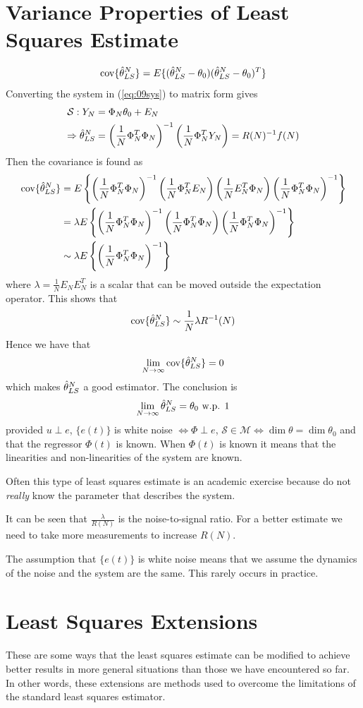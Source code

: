 \section{Variance Properties of Least Squares Estimate}
$$\text{cov}\{\hat{\theta}_{LS}^N\} = E\{(\hat{\theta}_{LS}^N-\theta_0)(\hat{\theta}_{LS}^N-\theta_0)^T\}$$
Converting the system in (\ref{eq:09sys}) to matrix form gives
\begin{align*}
\mathcal{S}: Y_N &= \Phi_N\theta_0+E_N \\
\Rightarrow \hat{\theta}_{LS}^N &= \left(\frac{1}{N}\Phi_N^T\Phi_N\right)^{-1}\left(\frac{1}{N}\Phi_N^TY_N\right) = R(N)^{-1}f(N)
\end{align*}
Then the covariance is found as
\begin{align*}
\text{cov}\{\hat{\theta}_{LS}^N\} &= E\left\lbrace\left(\frac{1}{N}\Phi_N^T\Phi_N\right)^{-1} \left(\frac{1}{N}\Phi_N^TE_N\right) \left(\frac{1}{N}E_N^T\Phi_N\right) \left(\frac{1}{N}\Phi_N^T\Phi_N\right)^{-1}\right\rbrace \\
&= \lambda E\left\lbrace\left(\frac{1}{N}\Phi_N^T\Phi_N\right)^{-1} \left(\frac{1}{N}\Phi_N^T\Phi_N\right) \left(\frac{1}{N}\Phi_N^T\Phi_N\right)^{-1}\right\rbrace \\
&\sim \lambda E\left\lbrace\left(\frac{1}{N}\Phi_N^T\Phi_N\right)^{-1}\right\rbrace
\end{align*}
where $\lambda = \frac{1}{N}E_NE_N^T$ is a scalar that can be moved outside the expectation operator. This shows that
$$\text{cov}\{\hat{\theta}_{LS}^N\} \sim \frac{1}{N}\lambda R^{-1}(N)$$
Hence we have that
$$\lim_{N\to\infty}\text{cov}\{\hat{\theta}_{LS}^N\} = 0$$
which makes $\hat{\theta}_{LS}^N$ a good estimator. The conclusion is
$$\lim_{N\to\infty}\hat{\theta}_{LS}^N = \theta_0 \text{ w.p. } 1$$
provided $u\perp e$, $\{e(t)\}$ is white noise $\Leftrightarrow \Phi\perp e$, $\mathcal{S}\in\mathcal{M} \Leftrightarrow \dim\theta = \dim\theta_0$ and that the regressor $\Phi(t)$ is known. When $\Phi(t)$ is known it means that the linearities and non-linearities of the system are known.

Often this type of least squares estimate is an academic exercise because do not \textit{really} know the parameter that describes the system.

It can be seen that $\frac{\lambda}{R(N)}$ is the noise-to-signal ratio. For a better estimate we need to take more measurements to increase $R(N)$.

The assumption that $\{e(t)\}$ is white noise means that we assume the dynamics of the noise and the system are the same. This rarely occurs in practice.

\section{Least Squares Extensions}
These are some ways that the least squares estimate can be modified to achieve better results in more general situations than those we have encountered so far. In other words, these extensions are methods used to overcome the limitations of the standard least squares estimator.

